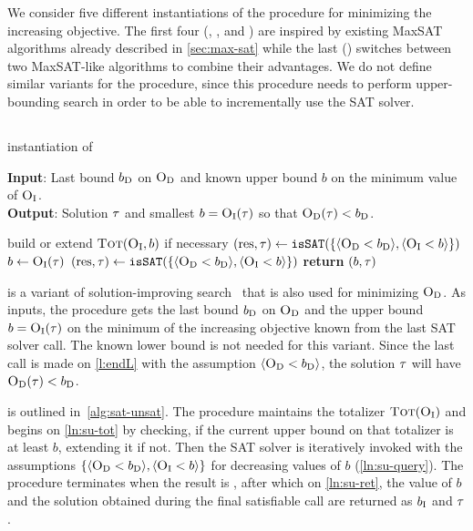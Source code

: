 We consider five different instantiations of the \Min{} procedure for minimizing the increasing objective.
The first four (\satunsat{}, \unsatsat{}, \msu{} and \oll{}) are inspired by existing MaxSAT algorithms already described in \cref{sec:max-sat} while the last (\msh{}) switches between two MaxSAT-like algorithms to combine their advantages.
We do not define similar variants for the \Simpr{} procedure, since this procedure needs to perform upper-bounding search in order to be able to incrementally use the SAT solver.

\subsection{\satunsat{}\label{sec:sat-unsat}}

\begin{algorithm}[t]
  \caption{\satunsat{} instantiation of \Min{}}\label{alg:sat-unsat}
  \textbf{Input}: Last bound $b_{\text{D}}$ on $\textsc{O}_{\text{D}}$ and known upper bound $b$ on the minimum value of $\textsc{O}_{\text{I}}$. \\
  \textbf{Output}: Solution $\tau$ and smallest $b=\textsc{O}_{\text{I}}(\tau)$ so that $\textsc{O}_{\text{D}}(\tau)<b_{\text{D}}$.

  \begin{algorithmic}[1]
    \STATE build or extend $\textsc{Tot}(\textsc{O}_{\text{I}},b)$ if necessary \label{ln:su-tot}
    \STATE $(\text{res},\tau) \gets \texttt{isSAT}(\{\langle \textsc{O}_{\text{D}} < b_{\text{D}} \rangle, \langle \textsc{O}_{\text{I}} < b \rangle\})$
    \WHILE{$\res = \sat$}
      \STATE $b \gets \textsc{O}_{\text{I}}(\tau)$
      \STATE $(\text{res},\tau) \gets \texttt{isSAT}(\{\langle \textsc{O}_{\text{D}} < b_{\text{D}} \rangle, \langle \textsc{O}_{\text{I}} < b \rangle\})$ \label{ln:su-query}
    \ENDWHILE
    \STATE \textbf{return} $(b,\tau)$ \label{ln:su-ret}
  \end{algorithmic}
\end{algorithm}

\satunsat{} is a variant of solution-improving search~\autocites{handbook2-maxsat,DBLP:journals/jsat/BerreP10,DBLP:journals/jsat/EenS06} that is also used for minimizing $\textsc{O}_{\text{D}}$. 
As inputs, the procedure gets the last bound $b_{\text{D}}$ on $\textsc{O}_{\text{D}}$ and the upper bound $b=\textsc{O}_{\text{I}}(\tau)$ on the minimum of the increasing objective known from the last SAT solver call.
The known lower bound is not needed for this variant.
Since the last call is made on \cref{l:endL} with the assumption $\langle \textsc{O}_{\text{D}} < b_{\text{D}} \rangle$, the solution $\tau$ will have $\textsc{O}_{\text{D}}(\tau) < b_{\text{D}}$. 

\satunsat{} is outlined in~\cref{alg:sat-unsat}.
The procedure maintains the totalizer $\textsc{Tot}(\textsc{O}_{\text{I}})$ and begins on \cref{ln:su-tot} by checking, if the current upper bound on that totalizer is at least $b$, extending it if not. 
Then the SAT solver is iteratively invoked with the assumptions $\{\langle \textsc{O}_{\text{D}} < b_{\text{D}} \rangle, \langle \textsc{O}_{\text{I}} < b \rangle\}$ for decreasing values of $b$ (\cref{ln:su-query}).
The procedure terminates when the result is \unsat{}, after which on \cref{ln:su-ret}, the value of $b$ and the solution obtained during the final satisfiable call are returned as $b_{\text{I}}$ and $\tau$.  

